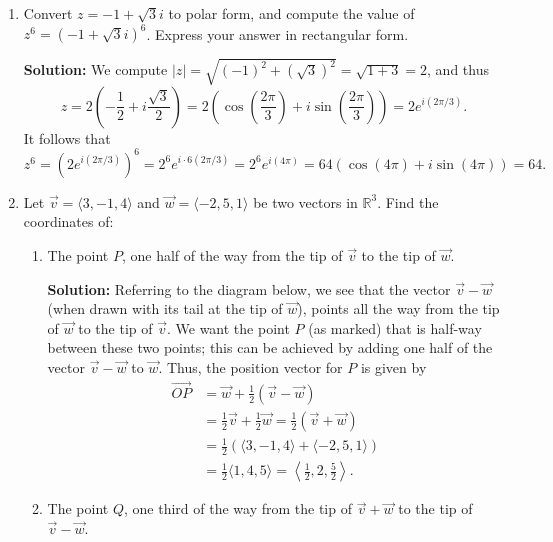 \documentclass[letterpaper,12pt]{article}
\newcommand{\abs}[1]{\lvert #1\rvert}
\newcommand{\R}{\mathbb{R}}
\begin{document}
\begin{enumerate}
\begin{enumerate}
\end{enumerate}

\medskip

\item Convert $z=-1+\sqrt{3}i$ to polar form, and compute the value of $z^6 = (-1+\sqrt{3}i)^6$. Express your answer in rectangular form.

\medskip

{\bf Solution:} We compute $\abs{z} = \sqrt{(-1)^2+(\sqrt{3})^2} = \sqrt{1+3} = 2$, and thus
\[
 z = 2\left(-\frac{1}{2}+i\frac{\sqrt{3}}{2}\right) = 2\left(\cos\left(\frac{2\pi}{3}\right)+i\sin\left(\frac{2\pi}{3}\right)\right) = 2e^{i(2\pi/3)}.
\]
It follows that
\[
 z^6 = (2e^{i(2\pi/3)})^6 = 2^6e^{i\cdot 6(2\pi/3)} = 2^6e^{i(4\pi)} = 64(\cos(4\pi)+i\sin(4\pi)) = 64.
\]

\bigskip

\item  Let $\vec{v} = \langle 3, -1, 4\rangle$ and $\vec{w} = \langle -2, 5, 1\rangle$ be two vectors in $\R^3$. Find the coordinates of:
\begin{enumerate}
 \item The point $P$, one half of the way from the tip of $\vec{v}$ to the tip of $\vec{w}$.

\medskip

{\bf Solution:} Referring to the diagram below, we see that the vector $\vec{v}-\vec{w}$ (when drawn with its tail at the tip of $\vec{w}$), points all the way from the tip of $\vec{w}$ to the tip of $\vec{v}$. We want the point $P$ (as marked) that is half-way between these two points; this can be achieved by adding one half of the vector $\vec{v}-\vec{w}$ to $\vec{w}$. Thus, the position vector for $P$ is given by
\begin{align*}
 \overrightarrow{OP} & = \vec{w}+\frac{1}{2}(\vec{v}-\vec{w})\\
 & = \frac{1}{2}\vec{v}+\frac{1}{2}\vec{w} = \frac{1}{2}(\vec{v}+\vec{w})\\
 & = \frac{1}{2}(\langle 3,-1,4\rangle + \langle -2,5,1\rangle)\\
 & = \frac{1}{2}\langle 1, 4, 5\rangle = \left\langle \frac{1}{2}, 2,\frac{5}{2}\right\rangle.
\end{align*}

\medskip

 \item The point $Q$, one third of the way from the tip of $\vec{v}+\vec{w}$ to the tip of $\vec{v}-\vec{w}$.

\medskip


\end{enumerate}
\end{enumerate}
\end{document}
